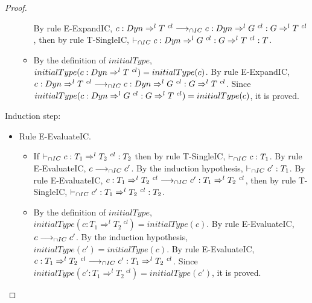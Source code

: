 \documentclass[a4paper]{article}
\begin{document}
\begin{proof}
\begin{itemize}
\begin{itemize}
        By rule E-ExpandIC, $c : Dyn \Rightarrow^l T\ ^{cl} \longrightarrow_{\cap IC} c : Dyn \Rightarrow^l G\ ^{cl} : G \Rightarrow^l T\ ^{cl}$, then by rule T-SingleIC, $\icts c : \Dyn \Rightarrow^l G\ ^{cl} : G \Rightarrow^l T\ ^{cl} : T$.
        \item By the definition of $initialType$, $initialType(c : Dyn \Rightarrow^l T\ ^{cl}) = initialType(c)$.
        By rule E-ExpandIC, $c : Dyn \Rightarrow^l T\ ^{cl} \longrightarrow_{\cap IC} c : Dyn \Rightarrow^l G\ ^{cl} : G \Rightarrow^l T\ ^{cl}$.
        Since $initialType(c : Dyn \Rightarrow^l G\ ^{cl} : G \Rightarrow^l T\ ^{cl}) = initialType(c)$, it is proved.
    \end{itemize}
\end{itemize}
Induction step:
\begin{itemize}
    \item Rule E-EvaluateIC.
    \begin{itemize}
        \item If $\icts c : T_1 \Rightarrow^l T_2\ ^{cl} : T_2$ then by rule T-SingleIC, $\vdash_{\cap IC} c : T_1$.
        By rule E-EvaluateIC, $c \longrightarrow_{\cap IC} c'$.
        By the induction hypothesis, $\vdash_{\cap IC} c' : T_1$.
        By rule E-EvaluateIC, $c : T_1 \Rightarrow^l T_2\ ^{cl} \longrightarrow_{\cap IC} c' : T_1 \Rightarrow^l T_2\ ^{cl}$, then by rule T-SingleIC, $\vdash_{\cap IC} c' : T_1 \Rightarrow^l T_2\ ^{cl} : T_2$.
        \item By the definition of $initialType$, $initialType(c : T_1 \Rightarrow^l T_2\ ^{cl}) = initialType(c)$.
        By rule E-EvaluateIC, $c \longrightarrow_{\cap IC} c'$.
        By the induction hypothesis, $initialType(c') = initialType(c)$.
        By rule E-EvaluateIC, $c : T_1 \Rightarrow^l T_2\ ^{cl} \longrightarrow_{\cap IC} c' : T_1 \Rightarrow^l T_2\ ^{cl}$.
        Since $initialType(c' : T_1 \Rightarrow^l T_2\ ^{cl}) = initialType(c')$, it is proved.
    \end{itemize}
\end{itemize}
\end{proof}
\end{document}
